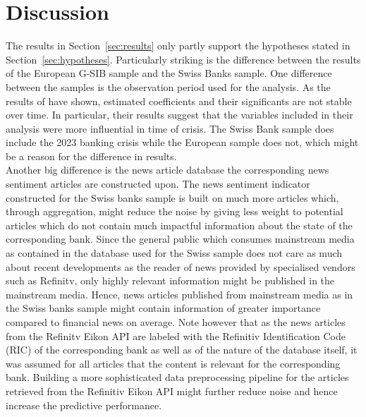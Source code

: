 


%
%
%


\section{Discussion}

The results in \mbox{Section~\ref{sec:results}} only partly support the hypotheses stated in \mbox{Section~\ref{sec:hypotheses}}. Particularly striking is the difference between the results of the European G-SIB sample and the Swiss Banks sample. One difference between the samples is the observation period used for the analysis. As the results of \cite{annaert2013} have shown, estimated coefficients and their significants are not stable over time. In particular, their results suggest that the variables included in their analysis were more influential in time of crisis. The Swiss Bank sample does include the 2023 banking crisis while the European sample does not, which might be a reason for the difference in results. \\

Another big difference is the news article database the corresponding news sentiment articles are constructed upon. The news sentiment indicator constructed for the Swiss banks sample is built on much more articles which, through aggregation, might reduce the noise by giving less weight to potential articles which do not contain much impactful information about the state of the corresponding bank. Since the general public which consumes mainstream media as contained in the database used for the Swiss sample does not care as much about recent developments as the reader of news provided by specialised vendors such as Refinitv, only highly relevant information might be published in the mainstream media. Hence, news articles published from mainstream media as in the Swiss banks sample might contain information of greater importance compared to financial news on average. Note however that as the news articles from the Refinitv Eikon API are labeled with the Refinitiv Identification Code (RIC) of the corresponding bank as well as of the nature of the database itself, it was assumed for all articles that the content is relevant for the corresponding bank. Building a more sophisticated data preprocessing pipeline for the articles retrieved from the Refinitiv Eikon API might further reduce noise and hence increase the predictive performance. \\

